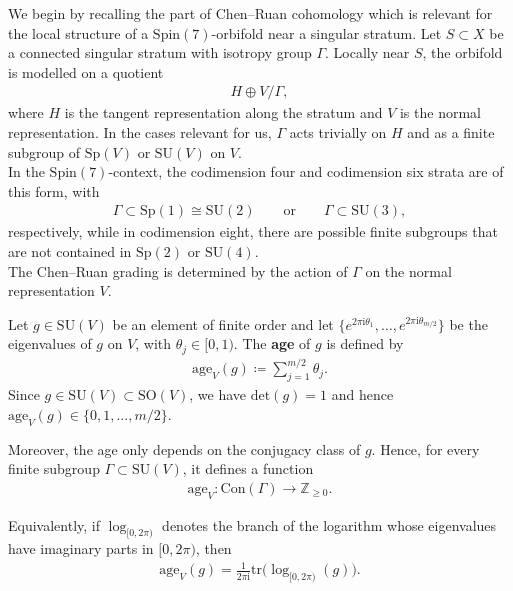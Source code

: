 \documentclass[psamsfonts]{amsart}
\theoremstyle{plain}
\theoremstyle{definition}{
\newtheorem{defi}{Definition}[section]
\newtheorem{ass}{Assumption}
\newtheorem*{nota}{Notation}}
\theoremstyle{remark}{
\newtheorem{rem}{Remark}
\newtheorem{ex}{Example}}
\theoremstyle{plain}{
\newtheorem{thm}{Theorem}[section]
\newtheorem{lem}{Lemma}[section]
\newtheorem{cor}{Corollary}[section]
\newtheorem{prop}{Proposition}[section]
\newtheorem{con}{Conjecture}[section]}
\newcommand{\m}[1]{{\mathrm{#1}}}
\begin{document}
We begin by recalling the part of Chen--Ruan cohomology which is relevant for the local structure of a $\m{Spin}(7)$-orbifold near a singular stratum. Let $S\subset X$ be a connected singular stratum with isotropy group $\Gamma$. Locally near $S$, the orbifold is modelled on a quotient
\begin{align*}
        H\oplus V/\Gamma ,
\end{align*}
where $H$ is the tangent representation along the stratum and $V$ is the normal representation. In the cases relevant for us, $\Gamma$ acts trivially on $H$ and as a finite subgroup of $\m{Sp}(V)$ or $\m{SU}(V)$ on $V$.\\

In the $\m{Spin}(7)$-context, the codimension four and codimension six strata are of this form, with
\begin{align*}
        \Gamma\subset \m{Sp}(1)\cong \m{SU}(2)
        \qquad\text{or}\qquad
        \Gamma\subset \m{SU}(3),
\end{align*}
respectively, while in codimension eight, there are possible finite subgroups that are not contained in $\m{Sp}(2)$ or $\m{SU}(4)$.\\

The Chen--Ruan grading is determined by the action of $\Gamma$ on the normal representation $V$.

\begin{defi}
Let $g\in \m{SU}(V)$ be an element of finite order and let $\{e^{2\pi \m{i}\theta_1},\dots,e^{2\pi \m{i}\theta_{m/2}}\}$
be the eigenvalues of $g$ on $V$, with $\theta_j\in[0,1)$. The \textbf{age} of $g$ is defined by
\begin{align*}
        \m{age}_V(g)
        \coloneqq
        \sum_{j=1}^{m/2} \theta_j .
\end{align*}
Since $g\in \m{SU}(V)\subset\m{SO}(V)$, we have $\m{det}(g)=1$  and hence $\m{age}_V(g)\in\{0,1,...,m/2\}$.
\end{defi}


Moreover, the age only depends on the conjugacy class of $g$. Hence, for every finite subgroup $\Gamma\subset \m{SU}(V)$, it defines a function
\begin{align*}
        \m{age}_V\colon \m{Con}(\Gamma)\longrightarrow \mathbb{Z}_{\geq 0}.
\end{align*}

\begin{rem}
Equivalently, if $\log_{[0,2\pi)}$ denotes the branch of the logarithm whose
eigenvalues have imaginary parts in $[0,2\pi)$, then
\begin{align*}
        \m{age}_V(g)
        =
        \frac{1}{2\pi\m{i}}
        \m{tr}\bigl(\log_{[0,2\pi)}(g)\bigr).
\end{align*}
\end{rem}
\end{document}
